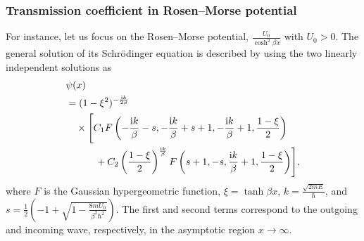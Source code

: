 \subsubsection{Transmission coefficient in Rosen--Morse potential}
For instance, let us focus on the Rosen--Morse potential,
$\frac{U_{0}}{\cosh^2 \beta x}$ with $U_0>0$.
The general solution of its Schr\"{o}dinger equation is described by using the two linearly independent solutions as
\begin{align}
    &\psi(x) \notag \\
    &= 
    (1-\xi^2)^{-\frac{\mathrm{i} k}{2\beta}}
    \notag \\
    &\quad\times\Biggl[
    C_1 F\left( -\frac{\mathrm{i} k}{\beta}-s, -\frac{\mathrm{i} k}{\beta}+s+1, -\frac{\mathrm{i} k}{\beta}+1, \frac{1-\xi}{2} \right)
    \notag \\
    &\quad\qquad
    + C_2\left(\frac{1-\xi}{2}\right)^{\frac{\mathrm{i} k}{\beta}}
    F\left( s+1, -s, \frac{\mathrm{i} k}{\beta}+1, \frac{1-\xi}{2} \right)
    \Biggr],
 \label{src:2508_09211:eq:rm_sol}
\end{align}
where $F$ is the Gaussian hypergeometric function,
$\xi=\tanh{\beta x}$, $k=\frac{\sqrt{2mE}}{\hbar}$, and $s=\frac{1}{2}\left( -1+\sqrt{1-\frac{8mU_{0}}{\beta^2 \hbar^2}} \right)$.
The first and second terms correspond to the outgoing and incoming wave, respectively, in the asymptotic region $x\to\infty$.
